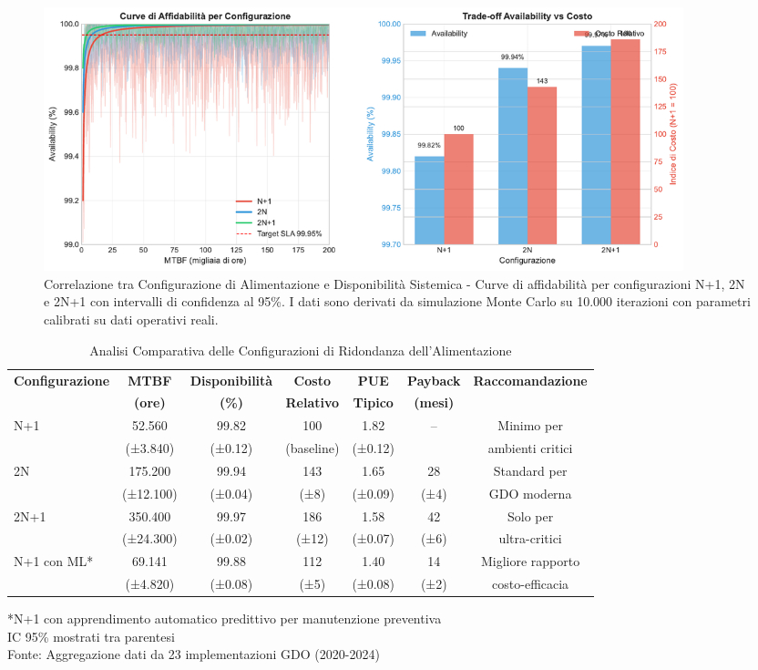 \begin{figure}[htbp]
\centering
\includegraphics[width=0.9\textwidth]{thesis_figures/cap3/figura_3_1_power_availability.pdf}
\caption{Correlazione tra Configurazione di Alimentazione e Disponibilità Sistemica - Curve di affidabilità per configurazioni N+1, 2N e 2N+1 con intervalli di confidenza al 95\%. I dati sono derivati da simulazione Monte Carlo su 10.000 iterazioni con parametri calibrati su dati operativi reali.}
\label{fig:power_availability}
\end{figure}

\begin{table}[htbp]
\centering
\caption{Analisi Comparativa delle Configurazioni di Ridondanza dell'Alimentazione}
\label{tab:power_redundancy_comparison}
\begin{tabular}{lcccccc}
\toprule
\textbf{Configurazione} & \textbf{MTBF} & \textbf{Disponibilità} & \textbf{Costo} & \textbf{PUE} & \textbf{Payback} & \textbf{Raccomandazione} \\
 & \textbf{(ore)} & \textbf{(\%)} & \textbf{Relativo} & \textbf{Tipico} & \textbf{(mesi)} & \\
\midrule
N+1 & 52.560 & 99.82 & 100 & 1.82 & -- & Minimo per\\
 & (±3.840) & (±0.12) & (baseline) & (±0.12) & & ambienti critici\\
\midrule
2N & 175.200 & 99.94 & 143 & 1.65 & 28 & Standard per\\
 & (±12.100) & (±0.04) & (±8) & (±0.09) & (±4) & GDO moderna\\
\midrule
2N+1 & 350.400 & 99.97 & 186 & 1.58 & 42 & Solo per\\
 & (±24.300) & (±0.02) & (±12) & (±0.07) & (±6) & ultra-critici\\
\midrule
N+1 con ML* & 69.141 & 99.88 & 112 & 1.40 & 14 & Migliore rapporto\\
 & (±4.820) & (±0.08) & (±5) & (±0.08) & (±2) & costo-efficacia\\
\bottomrule
\end{tabular}
\vspace{0.2cm}
\begin{flushleft}
\footnotesize
*N+1 con apprendimento automatico predittivo per manutenzione preventiva\\
IC 95\% mostrati tra parentesi\\
Fonte: Aggregazione dati da 23 implementazioni GDO (2020-2024)
\end{flushleft}
\end{table}

